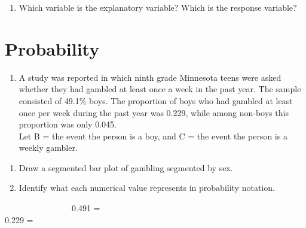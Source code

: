 \documentclass[
]{report}
\providecommand{\tightlist}{%
  \setlength{\itemsep}{0pt}\setlength{\parskip}{0pt}}
\begin{document}
\vspace{0.5in}

\begin{enumerate}
\def\labelenumi{\arabic{enumi}.}
\setcounter{enumi}{7}
\tightlist
\item
  Which variable is the explanatory variable? Which is the response variable?
\end{enumerate}

\newpage

\hypertarget{probability}{%
\section{Probability}\label{probability}}

\begin{enumerate}
\def\labelenumi{\arabic{enumi}.}
\setcounter{enumi}{8}
\tightlist
\item
  A study was reported in which ninth grade Minnesota teens were asked whether they had gambled at least once a week in the past year. The sample consisted of 49.1\% boys. The proportion of boys who had gambled at least once per week during the past year was 0.229, while among non-boys this proportion was only 0.045.\\
  Let B = the event the person is a boy, and C = the event the person is a weekly gambler.
  \vspace{0.1in}
\end{enumerate}

\begin{enumerate}
\def\labelenumi{\alph{enumi}.}
\item
  Draw a segmented bar plot of gambling segmented by sex.
  \vspace{2in}
\item
  Identify what each numerical value represents in probability notation.
  \vspace{.1in}
\end{enumerate}

~~~~~~~~~~~~~~~~0.491 = \vspace{.2in}\\
\hspace*{0.333em}\hspace*{0.333em}\hspace*{0.333em}\hspace*{0.333em}\hspace*{0.333em}\hspace*{0.333em}\hspace*{0.333em}\hspace*{0.333em}\hspace*{0.333em}\hspace*{0.333em}\hspace*{0.333em}\hspace*{0.333em}\hspace*{0.333em}\hspace*{0.333em}\hspace*{0.333em}\hspace*{0.333em}0.229 =
\end{document}
